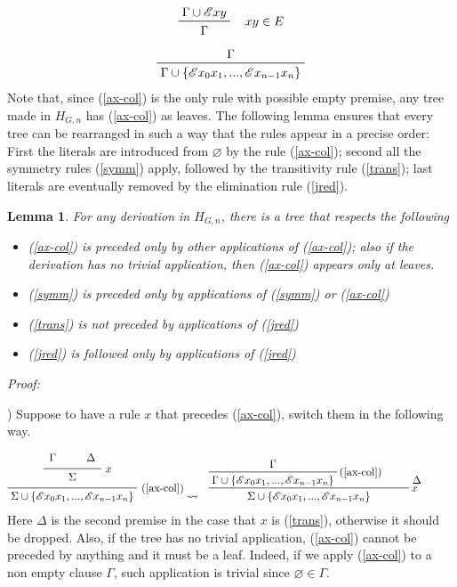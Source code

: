 \documentclass[a4paper,12pt,oneside]{book}
\newtheorem{lemma}[theorem]{Lemma}
\newcommand{\E}{\mathscr{E}}
\let\emptyset\varnothing
\begin{document}
\begin{equation}
\label{jred}
\prftree[r]{$\quad xy \in E $}{\Gamma \cup \E xy }{ \Gamma}
\end{equation}
\begin{equation}
 \label{ax-col}
\prftree{\Gamma}{ \Gamma \cup \{\E x_0 x_1 , ... , \E x_{n-1} x_n  \}}
\end{equation}
Note that, since (\ref{ax-col}) is the only rule with possible empty premise, any tree made in $H_{G,n}$  has (\ref{ax-col}) as leaves. The following lemma ensures that every tree can be rearranged in such a way that the rules appear in a precise order: First the literals are introduced from $\emptyset$ by the rule (\ref{ax-col}); second all the symmetry rules (\ref{symm}) apply, followed by the transitivity rule (\ref{trans}); last literals are eventually removed by the elimination rule (\ref{jred}).


\begin{lemma}\label{lemma_rules}
For any derivation in $H_{G,n}$, there is a tree that respects the following
\begin{itemize}
\item[1)] (\ref{ax-col}) is preceded only by other applications of (\ref{ax-col}); also if the derivation has no trivial application, then (\ref{ax-col}) appears only at leaves.
\item[2)] (\ref{symm}) is preceded only by applications of (\ref{symm}) or (\ref{ax-col})
\item[3)] (\ref{trans}) is not preceded by  applications of (\ref{jred})
\item[4)] (\ref{jred}) is followed only by  applications of (\ref{jred})
\end{itemize}\end{lemma}
\noindent\emph{Proof:}

) Suppose to have a rule $x$ that precedes (\ref{ax-col}), switch them in the following way. 

\begin{eqnarray*}
\prfrulenameskip=0.4em\prflinepadbefore=1ex
\prftree[r]{(\ref{ax-col})}{
\prftree[r]{$x$}{\Gamma}{\qquad\Delta}{\qquad\Sigma\qquad}
}{\Sigma\cup\{\E x_0 x_1 , ... , \E x_{n-1} x_n  \}}
& \leadsto
&\prftree[r]{$x$}{
\prftree[r]{(\ref{ax-col})}{\Gamma}{\Gamma\cup\{\E x_0 x_1 , ... , \E x_{n-1} x_n  \}}
}{\qquad\Delta\qquad\quad}{\Sigma\cup\{\E x_0 x_1 , ... , \E x_{n-1} x_n  \}}
 \end{eqnarray*}
Here $\Delta$ is the second premise in the case that $x$ is (\ref{trans}), otherwise it should be dropped. Also, if the tree has  no trivial application, (\ref{ax-col}) cannot be preceded by anything and it must be a leaf. Indeed, if we apply (\ref{ax-col}) to a non empty clause $\Gamma$, such application is trivial since $\emptyset\in\Gamma$.
 
\end{document}
